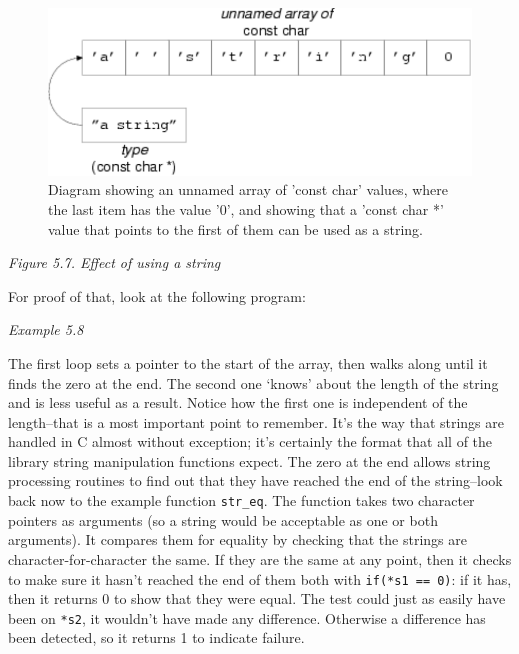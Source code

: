    \begin{figure}\centering\includegraphics[type=pdf,read=.pdf,ext=.pdf,scale=1.0]{figure/5.7}\caption{Diagram showing an unnamed array of 'const char' values, where the            last item has the value '0', and showing that a 'const char *'            value that points to the first of them can be used as a string.}\end{figure}

\begin{center}\textit{Figure 5.7. Effect of using a string}\end{center}


   For proof of that, look at the following program:


   \begin{center}\textit{Example 5.8}\end{center}


   The first loop sets a pointer to the start of the array, then walks
    along until it finds the zero at the end. The second one `knows'
    about the length of the string and is less useful as a result. Notice
    how the first one is independent of the length--that is a most
    important point to remember. It's the way that strings are handled in
    C almost without exception; it's certainly the format that all of the
    library string manipulation functions expect. The zero at the end allows
    string processing routines to find out that they have reached the end of
    the string--look back now to the example function
    \texttt{str\_eq}.  The function takes two character pointers as
    arguments (so a string would be acceptable as one or both arguments). It
    compares them for equality by checking that the strings are
    character-for-character the same. If they are the same at any point,
    then it checks to make sure it hasn't reached the end of them both with
    \texttt{if(*s1 == 0)}: if it has, then it returns 0 to show that
    they were equal. The test could just as easily have been on
    \texttt{*s2}, it wouldn't have made any difference.  Otherwise
    a difference has been detected, so it returns 1 to indicate failure.


